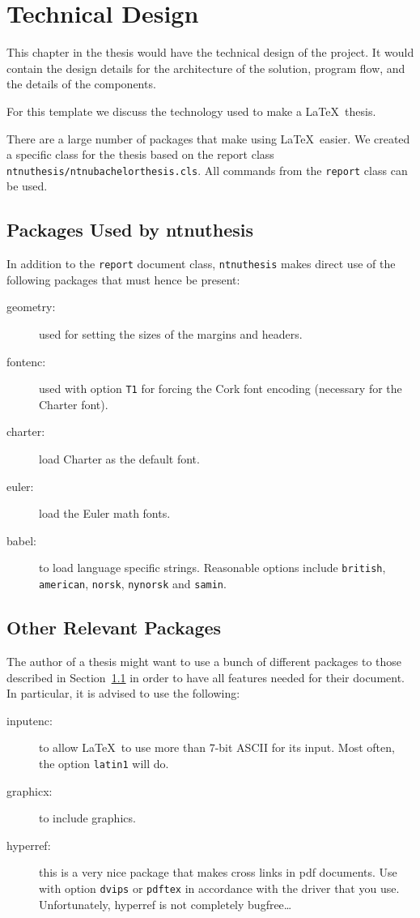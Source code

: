 \chapter{Technical Design}
\label{chap:technical}

This chapter in the thesis would have the technical design of the project.  It would contain the design details for the architecture of the solution, program flow, and the details of the components.

For this template we discuss the technology used to make a \LaTeX\ thesis.

There are a large number of packages that make using \LaTeX\ easier.
We created a specific class for the thesis based on the report class 
\texttt{ntnuthesis/ntnubachelorthesis.cls}. All commands from the \texttt{report} class can
be used.

\section{Packages Used by ntnuthesis}
\label{sec:packages}
In addition to the \texttt{report} document class,
\texttt{ntnuthesis} makes direct use of the following packages
that must hence be present:
\begin{description}
	\item[geometry:] used for setting the sizes of the margins and
  	headers.
	\item[fontenc:] used with option \texttt{T1} for forcing the Cork font
  	encoding (necessary for the Charter font).
	\item[charter:] load Charter as the default font.
	\item[euler:] load the Euler math fonts.
	\item[babel:] to load language specific strings. Reasonable options
	  include \texttt{british}, \texttt{american}, \texttt{norsk},
	  \texttt{nynorsk} and \texttt{samin}.
\end{description}

\section{Other Relevant Packages}
\label{sec:otherpackages}

The author of a thesis might want to use a bunch of different packages
to those described in Section~\ref{sec:packages} in order to have all features needed for their document. 
In particular, it is advised to use the following:
\begin{description}
	\item[inputenc:] to allow \LaTeX\ to use more than 7-bit ASCII for its
	  input. Most often, the option \texttt{latin1} will do.
	\item[graphicx:] to include graphics.
	\item[hyperref:] this is a very nice package that makes cross links in
	  pdf documents. Use with option \texttt{dvips} or \texttt{pdftex}
	  in accordance with the driver that you use. Unfortunately, hyperref
	  is not completely bugfree\dots
\end{description}


